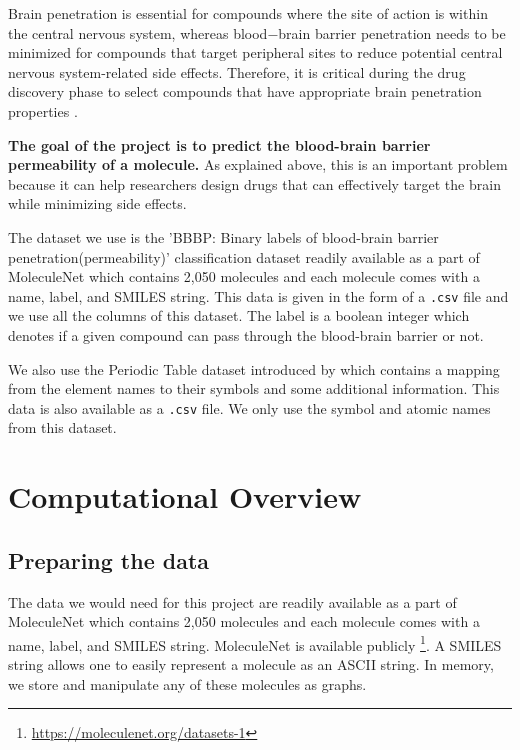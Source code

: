 \documentclass[fontsize=11pt]{article}
\begin{document}
Brain penetration is essential for compounds where the site of action is within the central nervous system, whereas blood$-$brain barrier penetration needs to be minimized for compounds that target peripheral sites to reduce potential central nervous system-related side effects. Therefore, it is critical during the drug discovery phase to select compounds that have appropriate brain penetration properties \citep{liu2004development}.

{\bf The goal of the project is to predict the blood-brain barrier permeability of a molecule.} As explained above, this is an important problem because it can help researchers design drugs that can effectively target the brain while minimizing side effects.

The dataset we use is the 'BBBP: Binary labels of blood-brain barrier penetration(permeability)' classification dataset readily available as a part of MoleculeNet \citep{wu2018moleculenet} which contains 2,050 molecules and each molecule comes with a name, label, and SMILES string. This data is given in the form of a \texttt{.csv} file and we use all the columns of this dataset. The label is a boolean integer which denotes if a given compound can pass through the blood-brain barrier or not. 

We also use the Periodic Table dataset introduced by \cite{periodicdataset} which contains a mapping from the element names to their symbols and some additional information. This data is also available as a \texttt{.csv} file. We only use the symbol and atomic names from this dataset.

\section*{Computational Overview}

\subsection*{Preparing the data}

The data we would need for this project are readily available as a part of MoleculeNet \citep{wu2018moleculenet} which contains 2,050 molecules and each molecule comes with a name, label, and SMILES string. MoleculeNet is available publicly \footnote{\url{https://moleculenet.org/datasets-1}}. A SMILES string allows one to easily represent a molecule as an ASCII string. In memory, we store and manipulate any of these molecules as graphs.
\end{document}
